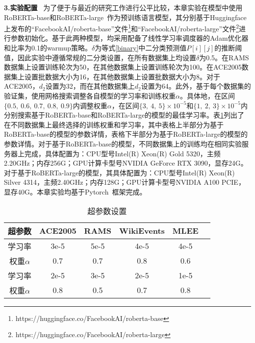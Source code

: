 \textbf{3.实验配置}~
为了便于与最近的研究工作进行公平比较，本章实验在模型中使用RoBERTa-base和RoBERTa-large~\cite{liu2019roberta}作为预训练语言模型，其分别基于Huggingface上发布的“FacebookAI/roberta-base”文件\footnote{https://huggingface.co/FacebookAI/roberta-base}和“FacebookAI/roberta-large”文件\footnote{https://huggingface.co/FacebookAI/roberta-large}进行参数初始化。基于此两种模型，均采用配备了线性学习率调度器的Adam优化器和比率为0.1的warmup策略。$\delta$为等式\ref{binary}中二分类预测值${P}[i][j]$的推断阈值，因此实验中遵循常规的二分类设置，在所有数据集上均设置$\delta$为0.5。在RAMS数据集上设置训练轮次为50，在其他数据集上设置训练轮次为100。在ACE2005数据集上设置批数据大小为16，在其他数据集上设置批数据大小为8。对于ACE2005，$d_{2}$设置为32，而在其他数据集上$d_{2}$设置为64。此外，基于每个数据集的验证集，使用网格搜索调整各自模型的学习率和训练权重$\alpha$。具体地，在区间$\{0.5,~0.6,~0.7,~0.8,~0.9\}$内调整权重$\alpha$，在区间$\{3,~4,~5\} \times 10^{-5}$和$\{1,~2,~3\} \times 10^{-5}$内分别搜索基于RoBERTa-base和RoBERTa-large的模型的最佳学习率。表\ref{hyperparameter}列出了在不同数据集上最终选择的训练权重和学习率，其中表格上半部分为基于RoBERTa-base的模型的参数详情，表格下半部分为基于RoBERTa-large的模型的参数详情。对于基于RoBERTa-base的模型，不同数据集上的训练均在相同实验服务器上完成，具体配置为：CPU型号Intel(R) Xeon(R) Gold 5320，主频2.20GHz；内存256G；GPU计算卡型号NVIDIA GeForce RTX 3090，显存24G。对于基于RoBERTa-large的模型，其具体配置为：CPU型号Intel(R) Xeon(R) Silver 4314，主频2.40GHz；内存128G；GPU计算卡型号NVIDIA A100 PCIE，显存40G。本章实验均基于Pytorch~\cite{paszke2017automatic}框架完成。

\begin{table}[htp]
\centering
\caption{超参数设置}
\begin{tabular}{cccccc}
\toprule
超参数 & ACE2005 & RAMS & WikiEvents & MLEE  \\
 \midrule
 学习率 & 3e-5 & 5e-5 & 4e-5 & 4e-5  \\
 权重$\alpha$ & 0.7 & 0.7 & 0.8 & 0.6  \\
\midrule
 学习率 & 2e-5 & 3e-5 & 2e-5 & 1e-5  \\
 权重$\alpha$ & 0.8 & 0.5 & 0.7 & 0.8  \\
 \bottomrule
\end{tabular}
\label{hyperparameter}
\end{table}

